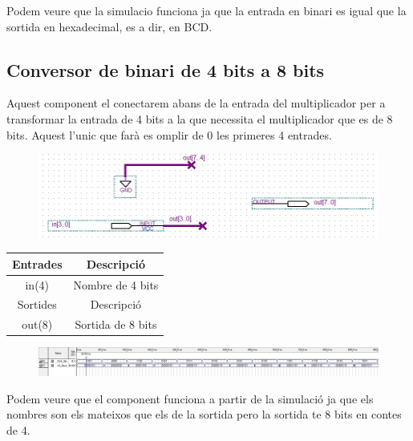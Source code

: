 \documentclass[12pt, a4papre]{article}
\begin{document}
	Podem veure que la simulacio funciona ja que la entrada en binari es igual que la sortida en hexadecimal, es a dir, en BCD.
	
	\subsection{Conversor de binari de 4 bits a 8 bits}
	
	Aquest component el conectarem abans de la entrada del multiplicador per a transformar la entrada de 4 bits a la que necessita el multiplicador que es de 8 bits. Aquest l'unic que farà es omplir de 0 les primeres 4 entrades.
	\begin{figure}[H]
		\begin{center}
		\includegraphics[width=130mm]{Bin_4_8.jpeg}
		\end{center}
	\end{figure}
	
	\begin{table}[h!]
		\centering
		 \begin{tabular}{|c | c|} 
			 \hline
			 Entrades & Descripció\\ [0.5ex] 
			 \hline
			 in(4) &  Nombre de 4 bits\\ 
			 \hline\hline
			 Sortides & Descripció\\ [0.5ex] 
			 \hline
			 out(8) & Sortida de 8 bits\\ 
			 \hline
		 \end{tabular}
	\end{table}
	
	\begin{figure}[H]
		\begin{center}
		\includegraphics[width=130mm]{4_8Simulacio.jpeg}
		\end{center}
	\end{figure}
	
	Podem veure que el component funciona a partir de la simulació ja que els nombres son els mateixos que els de la sortida pero la sortida te 8 bits en contes de 4.
	
\end{document}

